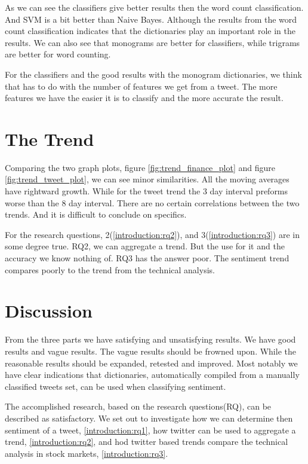 As we can see the classifiers give better results then the word count
classification. And SVM is a bit better than Naive Bayes. Although the results
from the word count classification indicates that the dictionaries play an
important role in the results. We can also see that monograms are better for
classifiers, while trigrams are better for word counting.

For the classifiers and the good results with the monogram dictionaries, we
think
that has to do with the number of features we get from a tweet. The more
features we have the easier it is to classify and the more accurate the result.
%

\section{The Trend}\label{results:trend}
Comparing the two graph plots, figure \ref{fig:trend_finance_plot} and figure
\ref{fig:trend_tweet_plot}, we can see minor similarities. All the moving
averages have rightward growth. While for the tweet trend the 3 day interval
preforms worse than the 8 day interval. There are no certain correlations
between the two trends. And it is difficult to conclude on specifics. 

For the research questions, 2(\ref{introduction:rq2}), and
3(\ref{introduction:rq3}) are in some degree true. RQ2, we can aggregate a
trend. But the use for it and the accuracy we know nothing of. RQ3 has the
answer poor. The sentiment trend compares poorly to the trend from the technical
analysis. 
%

\section{Discussion}\label{results:discussion}
From the three parts we have satisfying and unsatisfying results. We have good
results and vague results. The vague results should be frowned upon. While the
reasonable results should be expanded, retested and improved. 
Most notably we have clear indications that dictionaries, automatically compiled
from a manually classified tweets set, can be used when classifying sentiment. 

The accomplished research, based on the research questions(RQ), can be described as
satisfactory. We set out to investigate how we can determine then sentiment of
a tweet, \ref{introduction:rq1}, how twitter can be used to aggregate a trend,
\ref{introduction:rq2}, and hod twitter based trends compare the technical
analysis in stock markets, \ref{introduction:rq3}. 

